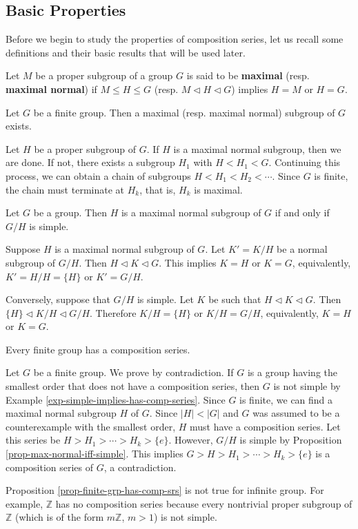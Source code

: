 \subsection{Basic Properties}
Before we begin to study the properties of composition series, let us recall some definitions and their basic results that will be used later.
\begin{definition} \label{def-maximal-subgrp}
	Let $M$ be a proper subgroup of a group $G$ is said to be \textbf{maximal} (resp. \textbf{maximal normal}) if   $M\leq H\leq G$ (resp. $M\lhd H\lhd G$) implies $H=M$ or $H = G$. 
\end{definition}
\begin{proposition} \label{prop-maximal-grp-exist}
	Let $G$ be a finite group. Then a maximal (resp. maximal normal) subgroup of $G$ exists.
\end{proposition}
\begin{sketch}
	Let $H$ be a proper subgroup of $G$. If $H$ is a maximal normal subgroup, then we are done. If not, there exists a subgroup $H_1$ with $H< H_1< G$. Continuing this process, we can obtain a chain of subgroups $H<H_1<H_2<\cdots $. Since $G$ is finite, the chain must terminate at $H_k$, that is, $H_k$ is maximal.
\end{sketch}
\begin{proposition} \label{prop-max-normal-iff-simple}
	Let $G$ be a group. Then $H$ is a maximal normal subgroup of $G$ if and only if $G/H$ is simple.
\end{proposition}
\begin{sketch} 
	Suppose $H$ is a maximal normal subgroup of $G$. Let $K'=K/H$ be a normal subgroup of $G/H$. Then $H\lhd K\lhd G$. This implies $K = H$ or $K = G$, equivalently, $K' = H/H = \{H\}$ or $K' = G/H$.
	
	Conversely, suppose that $G/H$ is simple. Let $K$ be such that $H\lhd K\lhd G$. Then $\{H\}\lhd K/H\lhd G/H$.   Therefore $K/H = \{H\}$ or $K/H = G/H$, equivalently, $K = H$ or $K = G$.
\end{sketch}

\begin{proposition} \label{prop-finite-grp-has-comp-srs}
	Every finite group has a composition series.
\end{proposition}
\begin{sketch}
	Let $G$ be a finite group. We prove by contradiction. If $G$ is a group having the smallest order that does not have a composition series, then $G$ is not simple by Example \ref{exp-simple-implies-has-comp-series}.  Since $G$ is finite, we can find a maximal normal subgroup $H$ of $G$. Since $|H|<|G|$ and $G$ was assumed to be a counterexample with the smallest order, $H$ must have a composition series. Let this series be $H>H_1>\cdots >H_k >\{e\}$. However, $G/H$ is simple by Proposition \ref{prop-max-normal-iff-simple}. This implies $G>H>H_1>\cdots >H_k >\{e\}$ is a composition series of $G$, a contradiction.
\end{sketch}
Proposition \ref{prop-finite-grp-has-comp-srs} is not true for infinite group. For example, $\mathbb{Z}$ has no composition series because every nontrivial proper subgroup of $\mathbb{Z}$ (which is of the form $m\mathbb{Z}$, $m>1$) is not simple.

